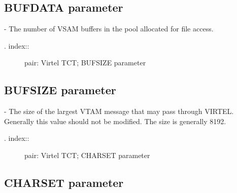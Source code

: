 \documentclass[letterpaper,10pt,english]{sphinxmanual}
\begin{document}
\subsection{BUFDATA parameter}
\label{\detokenize{Installation_Guide:bufdata-parameter}}
\begin{sphinxVerbatim}[commandchars=\\\{\}]
 
\end{sphinxVerbatim}

 - The number of VSAM buffers in the pool allocated for file access.
\begin{description}
\item[{. index::}] \leavevmode
pair: Virtel TCT; BUFSIZE parameter

\end{description}


\subsection{BUFSIZE parameter}
\label{\detokenize{Installation_Guide:bufsize-parameter}}
\begin{sphinxVerbatim}[commandchars=\\\{\}]
 
\end{sphinxVerbatim}

 - The size of the largest VTAM message that may pass through VIRTEL. Generally this value should not be modified. The size is generally 8192.
\begin{description}
\item[{. index::}] \leavevmode
pair: Virtel TCT; CHARSET parameter

\end{description}


\subsection{CHARSET parameter}
\label{\detokenize{Installation_Guide:charset-parameter}}
\begin{sphinxVerbatim}[commandchars=\\\{\}]
 
\end{sphinxVerbatim}
\end{document}
